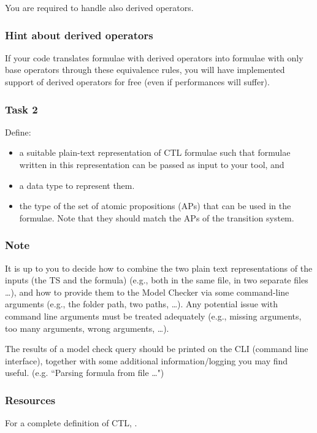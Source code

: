 \documentclass{article}
\begin{document}
You are required to handle also derived operators.

\subsubsection*{Hint about derived operators}
If your code translates formulae with derived operators into formulae 
with only base operators through these equivalence rules, you will have implemented support of 
derived operators for free (even if performances will suffer).

\color{red}
\subsubsection*{Task 2}
Define:
\begin{itemize}
    \item a suitable plain-text representation of CTL formulae such that formulae written in this representation can be passed as input to your tool, and 
    \item a data type to represent them.
    \item the type of the set of atomic propositions (APs) that can be used in the formulae. Note that they should 
            match the APs of the transition system.
\end{itemize}
\color{black}

\subsubsection*{Note}
It is up to you to decide how to combine the two plain text representations of the inputs (the TS and the formula) 
(e.g., both in the same file, in two separate files \dots), 
and how to provide them to the Model Checker via some command-line arguments 
(e.g., the folder path, two paths, \dots). 
Any potential issue with command line arguments must be treated adequately 
(e.g., missing arguments, too many arguments, wrong arguments, \dots).

The results of a model check query should be printed on the CLI (command line interface), 
together with some additional information/logging you may find useful.
(e.g. ``Parsing formula from file \dots")

\subsubsection*{Resources}
For a complete definition of CTL, \cite[Paragraph 6.2 (in particular 6.1.1 and 6.1.2)]{BaKa}.
\end{document}
